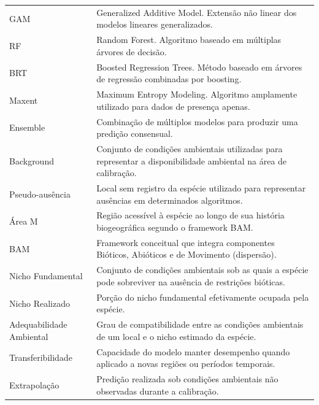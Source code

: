 \documentclass{ueap-sdm}
\begin{document}
\begin{longtable}{
		p{}
		p{}
	}
	GAM &
	Generalized Additive Model. Extensão não linear dos modelos lineares generalizados.
	\\
	
	RF &
	Random Forest. Algoritmo baseado em múltiplas árvores de decisão.
	\\
	
	BRT &
	Boosted Regression Trees. Método baseado em árvores de regressão combinadas por boosting.
	\\
	
	Maxent &
	Maximum Entropy Modeling. Algoritmo amplamente utilizado para dados de presença apenas.
	\\
	
	Ensemble &
	Combinação de múltiplos modelos para produzir uma predição consensual.
	\\
	
	Background &
	Conjunto de condições ambientais utilizadas para representar a disponibilidade ambiental na área de calibração.
	\\
	
	Pseudo-ausência &
	Local sem registro da espécie utilizado para representar ausências em determinados algoritmos.
	\\
	
	Área M &
	Região acessível à espécie ao longo de sua história biogeográfica segundo o framework BAM.
	\\
	
	BAM &
	Framework conceitual que integra componentes Bióticos, Abióticos e de Movimento (dispersão).
	\\
	
	Nicho Fundamental &
	Conjunto de condições ambientais sob as quais a espécie pode sobreviver na ausência de restrições bióticas.
	\\
	
	Nicho Realizado &
	Porção do nicho fundamental efetivamente ocupada pela espécie.
	\\
	
	Adequabilidade Ambiental &
	Grau de compatibilidade entre as condições ambientais de um local e o nicho estimado da espécie.
	\\
	
	Transferibilidade &
	Capacidade do modelo manter desempenho quando aplicado a novas regiões ou períodos temporais.
	\\
	
	Extrapolação &
	Predição realizada sob condições ambientais não observadas durante a calibração.
	\\
	

\end{longtable}
\end{document}
